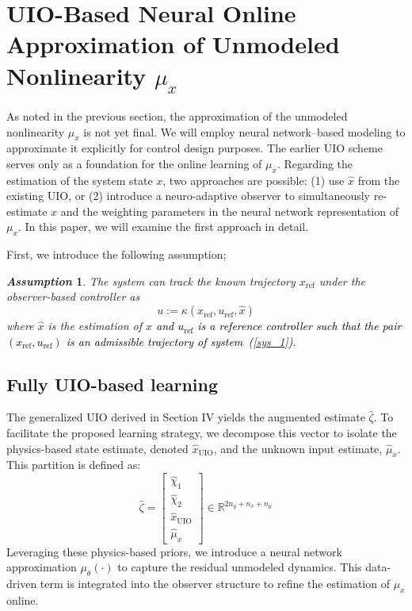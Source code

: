\documentclass{ifacconf}
\def\eqref#1{(\ref{#1})}
\def\refx{\mathrm{ref}}
\newtheorem{assumption}{\it \textbf{Assumption}}%
\begin{document}
\section{UIO-Based Neural Online Approximation of Unmodeled Nonlinearity $\mu_{x}$}\label{learning}
\vspace*{-0.3cm}
%
As noted in the previous section, the approximation of the unmodeled nonlinearity $\mu_{x}$ is not yet final. We will employ neural network--based modeling to approximate it explicitly for control design purposes. The earlier UIO scheme serves only as a foundation for the online learning of $\mu_{x}$. Regarding the estimation of the system state $x$, two approaches are possible: (1) use $\hat{x}$ from the existing UIO, or (2) introduce a neuro-adaptive observer to simultaneously re-estimate $x$ and the weighting parameters in the neural network representation of $\mu_{x}$. In this paper, we will examine the first approach in detail.  

First, we introduce the following assumption;
\begin{assumption}\label{huy_hyp1}
    The system can track the known trajectory $x_{\refx}$ under the observer-based controller as
    \begin{equation}\label{control}
        u := \kappa\left(x_\refx, u_{\refx},\hat{x}\right)
    \end{equation}
    where $\hat{x}$ is the estimation of $x$ \textcolor{black}{and $u_{\refx}$ is a reference controller such that the pair $\left(x_{\refx}, u_{\refx} \right)$ is an admissible trajectory of system~\eqref{sys_1}}.
\end{assumption}


\subsection{Fully UIO-based learning}\label{learning_uio}
\vspace*{-0.3cm}
The generalized UIO derived in Section IV yields the augmented estimate $\hat{\zeta}$. To facilitate the proposed learning strategy, we decompose this vector to isolate the physics-based state estimate, denoted $\hat{x}_{\text{UIO}}$, and the unknown input estimate, $\hat{\mu}_x$. This partition is defined as:
\begin{equation}
    \hat{\zeta} = \begin{bmatrix} \hat{\chi}_1 \\ \hat{\chi}_2 \\ \hat{x}_{\text{UIO}} \\ \hat{\mu}_x \end{bmatrix} \in \mathbb{R}^{2n_y + n_x + n_\mu}
\end{equation}
Leveraging these physics-based priors, we introduce a neural network approximation $\mu_{\theta}(\cdot)$ to capture the residual unmodeled dynamics. This data-driven term is integrated into the observer structure to refine the estimation of $\mu_x$ online.
\end{document}
